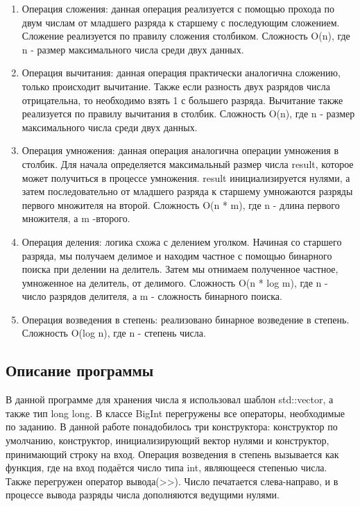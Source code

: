\documentclass[12pt]{article}
\begin{document}
\begin{enumerate}
\item Операция сложения: данная операция реализуется с помощью прохода по двум числам от младшего разряда к старшему с последующим сложением. Сложение реализуется по правилу сложения столбиком. Сложность O(n), где n - размер максимального числа среди двух данных. 
\item Операция вычитания: данная операция практически аналогична сложению, только происходит вычитание. Также если разность двух разрядов числа отрицательна, то необходимо взять 1 с большего разряда. Вычитание также реализуется по правилу вычитания в столбик. Сложность O(n), где n - размер максимального числа среди двух данных.
\item Операция умножения: данная операция аналогична операции умножения в столбик. Для начала определяется максимальный размер числа result, которое может получиться в процессе умножения. result инициализируется нулями, а затем последовательно от младшего разряда к старшему умножаются разряды первого множителя на второй. Сложность O(n * m), где n - длина первого множителя, а m -второго.
\item Операция деления: логика схожа с делением уголком. Начиная со старшего разряда, мы получаем делимое и находим частное с помощью бинарного поиска при делении на делитель. Затем мы отнимаем полученное частное, умноженное на делитель, от делимого. Сложность O(n * log m), где n - число разрядов делителя, а m - сложность бинарного поиска.
\item Операция возведения в степень: реализовано бинарное возведение в степень. Сложность O(log n), где n - степень числа.
\end{enumerate}

\subsection*{Описание программы}

В данной программе для хранения числа я использовал шаблон std::vector, а также тип long long. В классе BigInt перегружены все операторы, необходимые по заданию. В данной работе понадобилось три конструктора: конструктор по умолчанию, конструктор, инициализирующий вектор нулями и конструктор, принимающий строку на вход. Операция возведения в степень вызывается как функция, где на вход подаётся число типа int, являющееся степенью числа. Также перегружен оператор вывода(>>). Число печатается слева-направо, и в процессе вывода разряды числа дополняются ведущими нулями.
\end{document}

